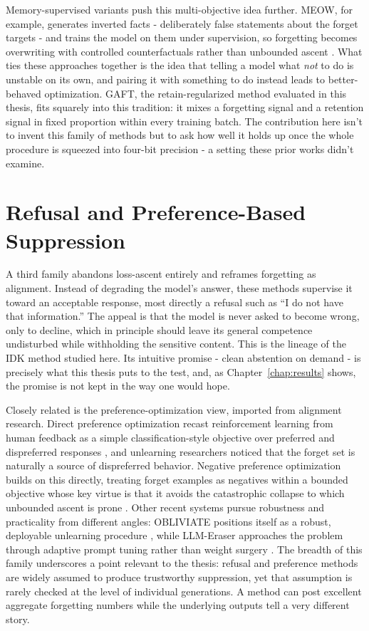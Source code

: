 \documentclass[a4paper,12pt]{report}
\begin{document}
Memory-supervised variants push this multi-objective idea further. MEOW, for example, generates inverted facts - deliberately false statements about the forget targets - and trains the model on them under supervision, so forgetting becomes overwriting with controlled counterfactuals rather than unbounded ascent \parencite{gu2024meow}. What ties these approaches together is the idea that telling a model what \emph{not} to do is unstable on its own, and pairing it with something to do instead leads to better-behaved optimization. GAFT, the retain-regularized method evaluated in this thesis, fits squarely into this tradition: it mixes a forgetting signal and a retention signal in fixed proportion within every training batch. The contribution here isn't to invent this family of methods but to ask how well it holds up once the whole procedure is squeezed into four-bit precision - a setting these prior works didn't examine.

\section{Refusal and Preference-Based Suppression}
A third family abandons loss-ascent entirely and reframes forgetting as alignment. Instead of degrading the model's answer, these methods supervise it toward an acceptable response, most directly a refusal such as ``I do not have that information.'' The appeal is that the model is never asked to become wrong, only to decline, which in principle should leave its general competence undisturbed while withholding the sensitive content. This is the lineage of the IDK method studied here. Its intuitive promise - clean abstention on demand - is precisely what this thesis puts to the test, and, as Chapter~\ref{chap:results} shows, the promise is not kept in the way one would hope.

Closely related is the preference-optimization view, imported from alignment research. Direct preference optimization recast reinforcement learning from human feedback as a simple classification-style objective over preferred and dispreferred responses \parencite{rafailov2023dpo}, and unlearning researchers noticed that the forget set is naturally a source of dispreferred behavior. Negative preference optimization builds on this directly, treating forget examples as negatives within a bounded objective whose key virtue is that it avoids the catastrophic collapse to which unbounded ascent is prone \parencite{zhang2024npo}. Other recent systems pursue robustness and practicality from different angles: OBLIVIATE positions itself as a robust, deployable unlearning procedure \parencite{xu2025obliviate}, while LLM-Eraser approaches the problem through adaptive prompt tuning rather than weight surgery \parencite{xu2024llmeraser}. The breadth of this family underscores a point relevant to the thesis: refusal and preference methods are widely assumed to produce trustworthy suppression, yet that assumption is rarely checked at the level of individual generations. A method can post excellent aggregate forgetting numbers while the underlying outputs tell a very different story.
\end{document}
